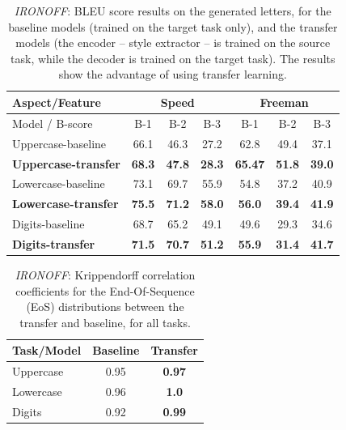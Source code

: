       \begin{table}[!htbp]
        \centering
        \begin{tabular}{l c c c|c c c}
          \hline
          \multicolumn{1}{l}{Aspect/Feature} & \multicolumn{3}{c}{ Speed } & \multicolumn{3}{c}{ Freeman }   \\ \hline
          Model / B-score      & B-1  & B-2  & B-3           & B-1  & B-2   & B-3              \\ \hline
          Uppercase-baseline &   66.1 & 46.3 & 27.2 & 62.8 & 49.4 & 37.1 \\%
          \textbf{Uppercase-transfer} &   \textbf{68.3} & \textbf{47.8} & \textbf{28.3} & \textbf{65.47} & \textbf{51.8} & \textbf{39.0} \\\hline

          Lowercase-baseline &   73.1 & 69.7 & 55.9 & 54.8 & 37.2 & 40.9 \\%
          \textbf{Lowercase-transfer} &   \textbf{75.5} & \textbf{71.2} & \textbf{58.0} & \textbf{56.0} & \textbf{39.4} & \textbf{41.9} \\\hline

          Digits-baseline &    68.7 & 65.2 & 49.1 & 49.6 & 29.3 & 34.6  \\%
          \textbf{Digits-transfer} &    \textbf{71.5} & \textbf{70.7} & \textbf{51.2} & \textbf{55.9} & \textbf{31.4} & \textbf{41.7} \\\hline

        \end{tabular}
        \caption{\textit{IRONOFF}: BLEU score results on the generated letters, for the baseline models (trained on the target task only), and the transfer models (the encoder -- style extractor -- is trained on the source task, while the decoder is trained on the target task). The results show the advantage of using transfer learning.}
        \label{table:bleu_score_ironoff_transfer}
      \end{table}

      \begin{table}[!htbp]
        \centering
        \begin{tabular}{l c c} \hline
        Task/Model & Baseline & Transfer \\ \hline
        Uppercase & 0.95 &  \textbf{0.97}\\ %
        Lowercase & 0.96 & \textbf{1.0} \\ %
        Digits & 0.92 & \textbf{0.99} \\ \hline
        \end{tabular}
        \caption{\textit{IRONOFF}: Krippendorff correlation coefficients for the End-Of-Sequence (EoS) distributions between the transfer and baseline, for all tasks.}
        \label{table:ironoff_eos_transfer}
      \end{table}

